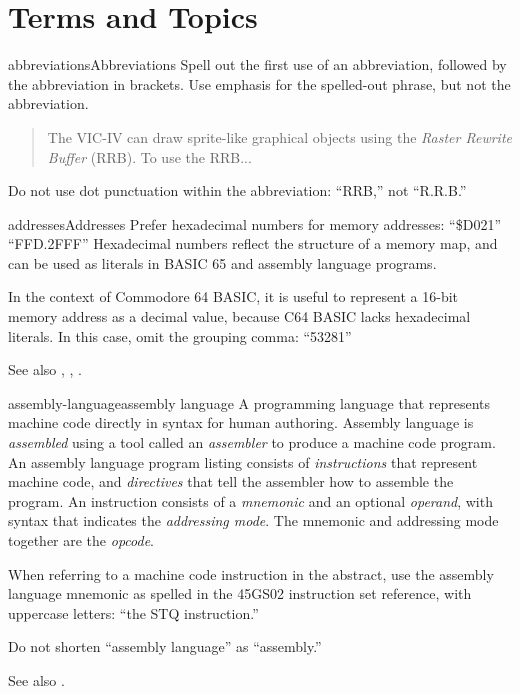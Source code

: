 
\chapter{Terms and Topics}
\label{cha:terms-and-topics}

\begin{sgentry}{abbreviations}{Abbreviations}
    Spell out the first use of an abbreviation, followed by the abbreviation in brackets. Use emphasis for the spelled-out phrase, but not the abbreviation.

    \begin{quote}
        The VIC-IV can draw sprite-like graphical objects using the \emph{Raster Rewrite Buffer} (RRB). To use the RRB...
    \end{quote}

    Do not use dot punctuation within the abbreviation: ``RRB,'' not ``R.R.B.''
\end{sgentry}

\begin{sgentry}{addresses}{Addresses}
    Prefer hexadecimal numbers for memory addresses: ``\$D021'' ``FFD.2FFF'' Hexadecimal numbers reflect the structure of a memory map, and can be used as literals in BASIC 65 and assembly language programs.

    In the context of Commodore 64 BASIC, it is useful to represent a 16-bit memory address as a decimal value, because C64 BASIC lacks hexadecimal literals. In this case, omit the grouping comma: ``53281''

    See also , , .
\end{sgentry}

\begin{sgentry}{assembly-language}{assembly language}
    A programming language that represents machine code directly in syntax for human authoring. Assembly language is \emph{assembled} using a tool called an \emph{assembler} to produce a machine code program. An assembly language program listing consists of \emph{instructions} that represent machine code, and \emph{directives} that tell the assembler how to assemble the program. An instruction consists of a \emph{mnemonic} and an optional \emph{operand}, with syntax that indicates the \emph{addressing mode}. The mnemonic and addressing mode together are the \emph{opcode}.

    When referring to a machine code instruction in the abstract, use the assembly language mnemonic as spelled in the 45GS02 instruction set reference, with uppercase letters: ``the STQ instruction.''

    Do not shorten ``assembly language'' as ``assembly.''

    See also .
\end{sgentry}

